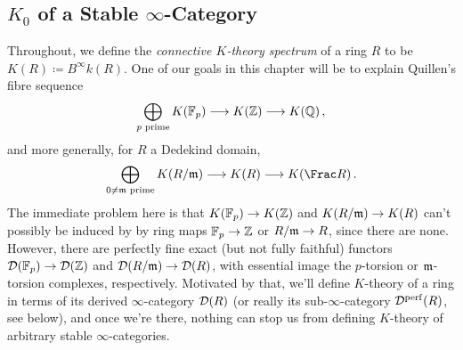 \documentclass[a4paper, 10pt, oneside, DIV=9, chapterprefix=true, numbers=enddot,bibliography=totoc]{scrbook}
\begin{document}
\subsection{\texorpdfstring{$K_0$}{K0} of a Stable \texorpdfstring{$\infty$}{Infinity}-Category}
\label{par:SomeMotivation}
Throughout, we define the \emph{connective $K$-theory spectrum} of a ring $R$ to be $K(R)\coloneqq B^\infty k(R)$. One of our goals in this chapter will be to explain Quillen's fibre sequence
\begin{equation*}
 \bigoplus_{p\text{ prime}}K(\IF_p)\morphism  K(\IZ)\morphism K(\IQ)\,,
\end{equation*}
and more generally, for $R$ a Dedekind domain,
\begin{equation*}
	\bigoplus_{0\neq \mm\text{ prime}}K(R/\mm)\morphism  K(R)\morphism K(\Frac R)\,.
\end{equation*}
The immediate problem here is that $K(\IF_p)\morphism K(\IZ)$ and $K(R/\mm)\morphism K(R)$ can't possibly be induced by by ring maps $\IF_p\morphism \IZ$ or $R/\mm\morphism R$, since there are none. However, there are perfectly fine exact (but not fully faithful) functors $\Dd(\IF_p)\morphism \Dd(\IZ)$ and $\Dd(R/\mm)\morphism \Dd(R)$, with essential image the $p$-torsion or $\mathfrak{m}$-torsion complexes, respectively. Motivated by that, we'll define $K$-theory of a ring in terms of its derived $\infty$-category $\mathcal{D}(R)$ (or really its sub-$\infty$-category $\mathcal{D}^{\mathrm{perf}}(R)$, see below), and once we're there, nothing can stop us from defining $K$-theory of arbitrary stable $\infty$-categories.
\end{document}
